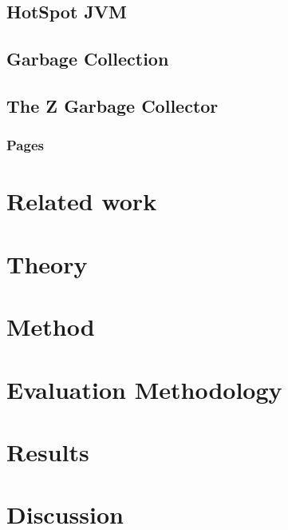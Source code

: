 \documentclass[a4paper,12pt]{article}
\begin{document}
\subsection{HotSpot JVM}
\label{sec:hotspot}


\subsection{Garbage Collection}
\label{sec:gc}


\newpage
\subsection{The Z Garbage Collector}
\label{sec:zgc}


\subsubsection{Pages}
\label{sec:zpage}


\section{Related work}


\section{Theory}
\label{sec:theory}


\section{Method}
\label{sec:method}


\section{Evaluation Methodology}
\label{sec:evaluation}


\section{Results}
\label{sec:results}


\section{Discussion}
\label{sec:discussion}

\end{document}
